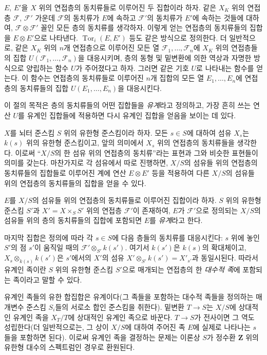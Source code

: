 $E$, $E'$을 $X$ 위의 연접층의 동치류들로 이루어진 두 집합이라 하자.
같은 $X_K$ 위의 연접층 $\mathcal F$, $\mathcal F'$ 가운데
$\mathcal F$의 동치류가 $E$에 속하고 $\mathcal F'$의 동치류가 $E'$에
속하는 것들에 대하여, $\mathcal F\otimes\mathcal F'$ 꼴인 모든 층의
동치류를 생각하자. 이렇게 얻는 연접층의 동치류들의 집합을
$E\otimes E'$으로 나타낸다. $\operatorname{Tor}_i(E,E')$ 등도 같은
방식으로 정의한다. 더 일반적으로, 같은 $X_K$ 위의 $n$개 연접층으로
이루어진 모든 열 $\mathcal F_1,\ldots,\mathcal F_n$에 $X_K$ 위의
연접층들의 집합 $U(\mathcal F_1,\ldots,\mathcal F_n)$을 대응시키며,
층의 동형 및 밑변환에 의한 역상과 자명한 방식으로 양립하는 함수 $U$가
주어졌다고 하자. 그러면 같은 기호 $U$로 나타내는 함수를 얻는다. 이 함수는
연접층의 동치류들로 이루어진 $n$개 집합의 모든 열
$E_1,\ldots,E_n$에 연접층의 동치류들의 집합
$U(E_1,\ldots,E_n)$을 대응시킨다.

이 절의 목적은 층의 동치류들의 어떤 집합들을 \emph{유계}라고 정의하고,
가장 흔히 쓰는 연산 $U$를 유계인 집합들에 적용하면 다시 유계인 집합을
얻음을 보이는 데 있다.

$X$를 뇌터 준스킴 $S$ 위의 유한형 준스킴이라 하자. 모든 $s\in S$에
대하여 섬유 $X_s$는 $k(s)$ 위의 유한형 준스킴이고, 앞의 의미에서
$X_s$ 위의 연접층의 동치류들을 생각한다. 이로써 ``$X/S$의 한 섬유 위의
연접층의 동치류''라는 표현과 그와 비슷한 표현들이 의미를 갖는다. 마찬가지로
각 섬유에서 따로 진행하면, $X/S$의 섬유들 위의 연접층의 동치류들의
집합들로 이루어진 계에 연산 $E\otimes E'$ 등을 적용하여 다른
$X/S$의 섬유들 위의 연접층의 동치류들의 집합을 얻을 수 있다.

 $E$를 $X/S$의 섬유들 위의 연접층의 동치류들로
이루어진 집합이라 하자. $S$ 위의 유한형 준스킴 $S'$과
$X'=X\times_S S'$ 위의 연접층 $\mathcal F'$이 존재하여, $E$가
$\mathcal F'$으로 정의되는 $X/S$의 섬유들 위의 층의 동치류들의 집합에
포함되면 $E$를 \emph{유계}라고 한다.

마지막 집합은 정의에 따라 각 $s\in S$에 다음 층들의 동치류를 대응시킨다:
$s$ 위에 놓인 $S'$의 점 $s'$이 움직일 때의
$\mathcal F'\otimes_{S'}k(s')$. 여기서 $k(s')$은 $k(s)$의 확대체이고,
$X_s\otimes_{k(s)}k(s')$은 $s'$에서의 $X'$의 섬유
$X'\otimes_{S'}k(s')=X'_{s'}$과 동일시된다. 따라서 유계인 족이란
$S$ 위의 유한형 준스킴 $S'$으로 매개되는 연접층의 한 \emph{대수적 족}에
포함되는 족이라고 말할 수 있다.

유계인 족들의 유한 합집합은 유계이다(그 족들을 포함하는 대수적 족들을
정의하는 매개변수 준스킴 $S_i$들의 서로소 합인 준스킴을 취한다).
밑변환 $T\longrightarrow S$는 $X/S$에 상대적인 유계인 족을
$X_T/T$에 상대적인 유계인 족으로 바꾼다. $T\longrightarrow S$가
전사이면 그 역도 성립한다(더 일반적으로는, 그 상이 $X/S$에 대하여 주어진
족 $E$에 실제로 나타나는 $s$들을 포함하면 된다). 이로써 유계인 족을
결정하는 문제는 이론상 $S$가 정수환 $\mathbf Z$ 위의 유한형 대수의
스펙트럼인 경우로 환원된다.

